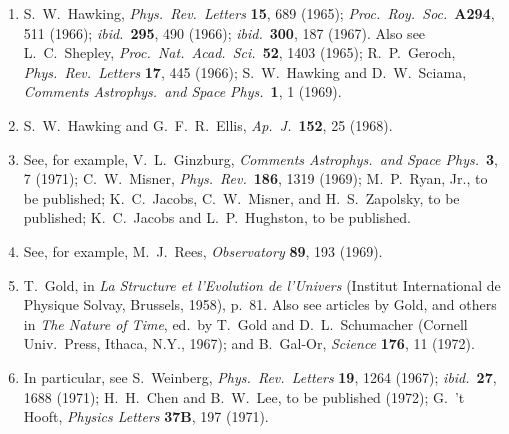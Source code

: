 \begin{enumerate}
  \item{}\label{ch15-ref-168}
  S.~W.~Hawking, \emph{Phys.\ Rev.\ Letters} \textbf{15}, 689 (1965);
  \emph{Proc.\ Roy.\ Soc.}\ \textbf{A294}, 511 (1966);
  \emph{ibid.}\ \textbf{295}, 490 (1966);
  \emph{ibid.}\ \textbf{300}, 187 (1967).
  Also see L.~C.~Shepley,
  \emph{Proc.\ Nat.\ Acad.\ Sci.}\ \textbf{52}, 1403 (1965);
  R.~P.~Geroch, \emph{Phys.\ Rev.\ Letters} \textbf{17}, 445 (1966);
  S.~W.~Hawking and D.~W.~Sciama,
  \emph{Comments Astrophys.\ and Space Phys.}\ \textbf{1}, 1 (1969).

  \item{}\label{ch15-ref-169}
  S.~W.~Hawking and G.~F.~R.~Ellis,
  \emph{Ap.\ J.}\ \textbf{152}, 25 (1968).

  \item{}\label{ch15-ref-170}
  See, for example, V.~L.~Ginzburg,
  \emph{Comments Astrophys.\ and Space Phys.}\ \textbf{3}, 7 (1971);
  C.~W.~Misner, \emph{Phys.\ Rev.}\ \textbf{186}, 1319 (1969);
  M.~P.~Ryan, Jr., to be published;
  K.~C.~Jacobs, C.~W.~Misner, and H.~S.~Zapolsky, to be published;
  K.~C.~Jacobs and L.~P.~Hughston, to be published.

  \item{}\label{ch15-ref-171}
  See, for example, M.~J.~Rees,
  \emph{Observatory} \textbf{89}, 193 (1969).

  \item{}\label{ch15-ref-172}
  T.~Gold, in \emph{La Structure et l'Evolution de l'Univers}
  (Institut International de Physique Solvay, Brussels, 1958), p.~81.
  Also see articles by Gold, and others in \emph{The Nature of Time},
  ed.\ by T.~Gold and D.~L.~Schumacher
  (Cornell Univ.\ Press, Ithaca, N.Y., 1967);
  and B.~Gal-Or, \emph{Science} \textbf{176}, 11 (1972).

  \item{}\label{ch15-ref-173}
  In particular, see S.~Weinberg,
  \emph{Phys.\ Rev.\ Letters} \textbf{19}, 1264 (1967);
  \emph{ibid.}\ \textbf{27}, 1688 (1971);
  H.~H.~Chen and B.~W.~Lee, to be published (1972);
  G.~'t Hooft, \emph{Physics Letters} \textbf{37B}, 197 (1971).
\end{enumerate}
